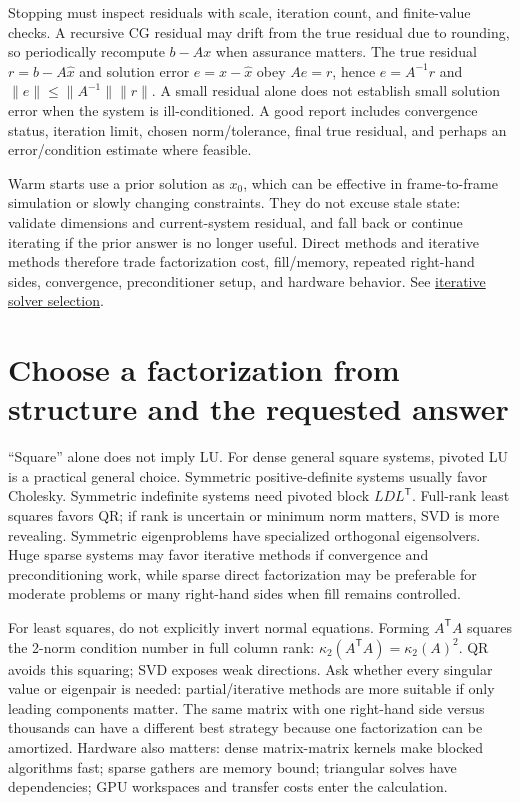 Stopping must inspect residuals with scale, iteration count, and finite-value checks. A recursive CG residual may drift from the true residual due to rounding, so periodically recompute \(b-Ax\) when assurance matters. The true residual \(r=b-A\hat x\) and solution error \(e=x-\hat x\) obey \(Ae=r\), hence \(e=A^{-1}r\) and \(\|e\|\le\|A^{-1}\|\|r\|\). A small residual alone does not establish small solution error when the system is ill-conditioned. A good report includes convergence status, iteration limit, chosen norm/tolerance, final true residual, and perhaps an error/condition estimate where feasible.

Warm starts use a prior solution as \(x_0\), which can be effective in frame-to-frame simulation or slowly changing constraints. They do not excuse stale state: validate dimensions and current-system residual, and fall back or continue iterating if the prior answer is no longer useful. Direct methods and iterative methods therefore trade factorization cost, fill/memory, repeated right-hand sides, convergence, preconditioner setup, and hardware behavior. See \hyperref[02-foundations-ii-ch038-sparse-storage-changes-the-cost-model]{iterative solver selection}.

\section{Choose a factorization from structure and the requested answer}\label{02-foundations-ii-ch038-choose-a-factorization-from-structure-and-the-requested-answer}

\hypertarget{02-foundations-ii-ch038-choose-a-factorization-from-structure-and-the-requested-answer}{}

``Square'' alone does not imply LU. For dense general square systems, pivoted LU is a practical general choice. Symmetric positive-definite systems usually favor Cholesky. Symmetric indefinite systems need pivoted block \(LDL^\mathsf T\). Full-rank least squares favors QR; if rank is uncertain or minimum norm matters, SVD is more revealing. Symmetric eigenproblems have specialized orthogonal eigensolvers. Huge sparse systems may favor iterative methods if convergence and preconditioning work, while sparse direct factorization may be preferable for moderate problems or many right-hand sides when fill remains controlled.

For least squares, do not explicitly invert normal equations. Forming \(A^\mathsf TA\) squares the 2-norm condition number in full column rank: \(\kappa_2(A^\mathsf TA)=\kappa_2(A)^2\). QR avoids this squaring; SVD exposes weak directions. Ask whether every singular value or eigenpair is needed: partial/iterative methods are more suitable if only leading components matter. The same matrix with one right-hand side versus thousands can have a different best strategy because one factorization can be amortized. Hardware also matters: dense matrix-matrix kernels make blocked algorithms fast; sparse gathers are memory bound; triangular solves have dependencies; GPU workspaces and transfer costs enter the calculation.

